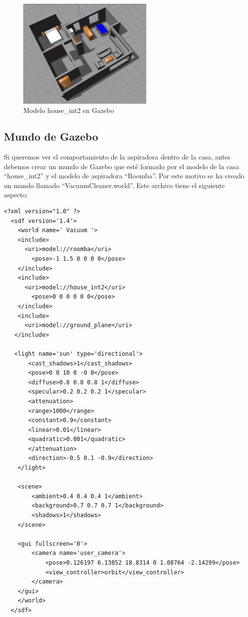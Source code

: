 \begin{figure}[H]
  \begin{center}
    \includegraphics[width=0.6\textwidth]{figures/Vacuum/casa.png}
		\caption{Modelo house\_int2 en Gazebo}
		\label{fig.casa}
		\end{center}
\end{figure}

\subsection{Mundo de Gazebo}
Si queremos ver el comportamiento de la aspiradora dentro de la casa, antes debemos crear un mundo de Gazebo que esté formado por el modelo de la casa ``house\_int2'' y el modelo de aspiradora ``Roomba''. Por este motivo se ha creado un mundo llamado ``VacuumCleaner.world''. Este archivo tiene el siguiente aspecto:

\vspace{20pt}
	\begin{lstlisting}[frame=single]
<?xml version="1.0" ?>
  <sdf version='1.4'>
    <world name=' Vacuum '>
    <include>
      <uri>model://roomba</uri>
        <pose>-1 1.5 0 0 0 0</pose>
    </include>
    <include>
      <uri>model://house_int2</uri>
        <pose>0 0 0 0 0 0</pose>
    </include>
    <include>
      <uri>model://ground_plane</uri>
   </include>

   <light name='sun' type='directional'>
       <cast_shadows>1</cast_shadows>
       <pose>0 0 10 0 -0 0</pose>
       <diffuse>0.8 0.8 0.8 1</diffuse>
       <specular>0.2 0.2 0.2 1</specular>
       <attenuation>
       <range>1000</range>
       <constant>0.9</constant>
       <linear>0.01</linear>
       <quadratic>0.001</quadratic>
       </attenuation>
       <direction>-0.5 0.1 -0.9</direction>
    </light>

    <scene>
        <ambient>0.4 0.4 0.4 1</ambient>
        <background>0.7 0.7 0.7 1</background>
        <shadows>1</shadows>
    </scene>

    <gui fullscreen='0'>
        <camera name='user_camera'>
            <pose>0.126197 6.13852 18.8314 0 1.08764 -2.14299</pose>
            <view_controller>orbit</view_controller>
        </camera>
    </gui>
    </world>
  </sdf>

	\end{lstlisting}

